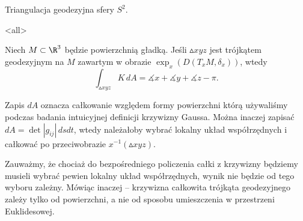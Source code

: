 \begin{frame}

\begin{przyklad}
Triangulacja geodezyjna sfery $S^2$.
\begin{center}

\end{center}
\end{przyklad}


\end{frame}
% 
\mode<all>{}
\begin{frame}[<+->]
\begin{twierdzenie}
Niech $M\subset \R^3$ będzie powierzchnią gładką. Jeśli $\vartriangle xyz$ jest trójkątem geodezyjnym na $M$ zawartym w obrazie $\exp_x(D(T_xM,\delta_x))$, wtedy
\[\int_{\vartriangle xyz} K\,dA=\measuredangle x+\measuredangle y +\measuredangle z - \pi.\]
\end{twierdzenie}
\begin{uwaga}
Zapis $dA$ oznacza całkowanie względem formy powierzchni którą używaliśmy podczas badania intuicyjnej definicji krzywizny Gaussa. Można inaczej zapisać $dA=\det|g_{ij}|\,dsdt$, wtedy należałoby wybrać lokalny układ współrzędnych i całkować po przeciwobrazie $x^{-1}(\vartriangle xyz)$. 

\end{uwaga}

\end{frame}
Zauważmy, że chociaż do bezpośredniego policzenia całki z krzywizny będziemy musieli wybrać pewien lokalny układ współrzędnych, wynik nie będzie od tego wyboru zależny. Mówiąc inaczej -- krzywizna całkowita trójkąta geodezyjnego zależy tylko od powierzchni, a nie od sposobu umieszczenia w przestrzeni Euklidesowej.
